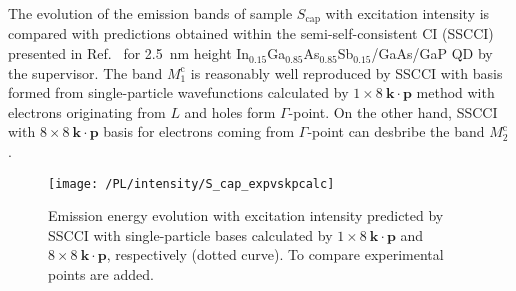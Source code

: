 %		
		


The evolution of the emission bands of sample $S_\mathrm{cap}$ with excitation intensity is compared with predictions obtained within the semi-self-consistent CI (SSCCI) presented in Ref.~\citep{Klenovsky2017} %
for 2.5~nm height In$_{0.15}$Ga$_{0.85}$As$_{0.85}$Sb$_{0.15}$/GaAs/GaP QD by the supervisor. The band $M_1^\mathrm{c}$ is reasonably well reproduced by SSCCI with basis formed from single-particle wavefunctions calculated by $1\times8~\mathbf{k \cdot p}$ method with electrons originating from $L$ and holes form $\Gamma$-point. On the other hand, SSCCI with $8\times8~\mathbf{k \cdot p}$ basis for electrons coming from $\Gamma$-point can desbribe the band $M_2^\mathrm{c}$.
\begin{figure}
	\centering
	\texttt{[image: /PL/intensity/S\_cap\_expvskpcalc]}
	\caption{Emission energy evolution with excitation intensity predicted by SSCCI with single-particle bases calculated by $1\times8~\mathbf{k \cdot p}$ and $8\times8~\mathbf{k \cdot p}$, respectively (dotted curve). To compare experimental points are added.}
	\label{fig:QD_cap_int_expvstheory}
\end{figure}

\newpage
